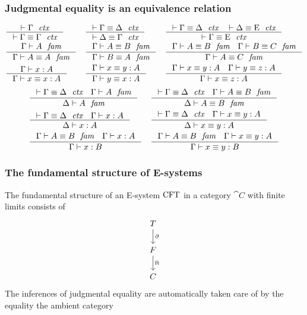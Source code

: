 \documentclass[handout]{beamer}
\begin{document}
\begin{frame}
\frametitle{Judgmental equality is an equivalence relation}
\begin{footnotesize}
\begin{align*}
& \inference
  { \jctx{\Gamma}
    }
  { \jctxeq{\Gamma}{\Gamma}
    } 
& & \inference
    { \jctxeq{\Gamma}{\Delta}
      }
    { \jctxeq{\Delta}{\Gamma}
      } 
& & \inference
    { \jctxeq{\Gamma}{\Delta}
      \jctxeq{\Delta}{\greek{E}}
      }
    { \jctxeq{\Gamma}{\greek{E}}
      }
    \\
& \inference
  { \jfam{\Gamma}{A}
    }
  { \jfameq{\Gamma}{A}{A}
    } 
& & \inference
    { \jfameq{\Gamma}{A}{B}
      }
    { \jfameq{\Gamma}{B}{A}
      }
& & \inference
    { \jfameq{\Gamma}{A}{B}
      \jfameq{\Gamma}{B}{C}
      }
    { \jfameq{\Gamma}{A}{C}
      }
    \\
& \inference
  { \jterm{\Gamma}{A}{x}
    }
  { \jtermeq{\Gamma}{A}{x}{x}
    }
& & \inference
    { \jtermeq{\Gamma}{A}{x}{y}
      }
    { \jtermeq{\Gamma}{A}{y}{x}
      }
& & \inference
    { \jtermeq{\Gamma}{A}{x}{y}
      \jtermeq{\Gamma}{A}{y}{z}
      }
    { \jtermeq{\Gamma}{A}{x}{z}
      }
\end{align*}
\begin{align*}
& \inference
  { \jctxeq{\Gamma}{\Delta}
    \jfam{\Gamma}{A}
    }
  { \jfam{\Delta}{A}
    }
& & \inference
    { \jctxeq{\Gamma}{\Delta}
      \jfameq{\Gamma}{A}{B}
      }
    { \jfameq{\Delta}{A}{B}
      }
    \\
& \inference
  { \jctxeq{\Gamma}{\Delta}
    \jterm{\Gamma}{A}{x}
    }
  { \jterm{\Delta}{A}{x}
    }
& & \inference
    { \jctxeq{\Gamma}{\Delta}
      \jtermeq{\Gamma}{A}{x}{y}
      }
    { \jtermeq{\Delta}{A}{x}{y}
      }
    \\
& \inference
  { \jfameq{\Gamma}{A}{B}
    \jterm{\Gamma}{A}{x}
    }
  { \jterm{\Gamma}{B}{x}
    }
& & \inference
    { \jfameq{\Gamma}{A}{B}
      \jtermeq{\Gamma}{A}{x}{y}
      }
    { \jtermeq{\Gamma}{B}{x}{y}
      }
\end{align*}
\end{footnotesize}
\end{frame}

\begin{frame}
\frametitle{The fundamental structure of E-systems}
The fundamental structure of an E-system $\mathrm{CFT}$ in a category
$\cat{C}$ with finite limits consists of
\begin{equation*}
\begin{tikzcd}
\stesyst
  \ar{d}{\ebd}
  \\
\stesysf
  \ar{d}{\eft}
  \\
\stesysc
\end{tikzcd}
\end{equation*}
The inferences of judgmental equality are automatically taken
care of by the equality the ambient category
\end{frame}
\end{document}
